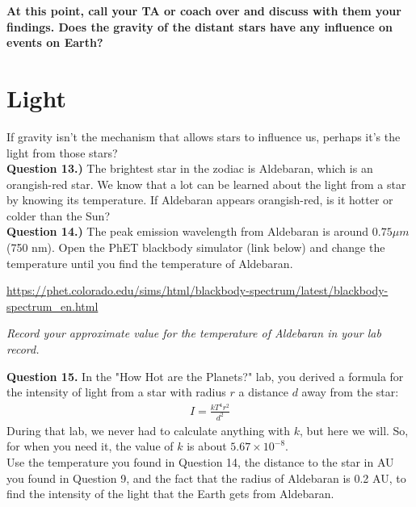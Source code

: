 \documentclass[11pt]{article}
\begin{document}
\bf At this point, call your TA or coach over and discuss with them your findings. Does the gravity of the distant stars have any influence on events on Earth?

\rm 

\newpage

\section{Light}
If gravity isn't the mechanism that allows stars to influence us, perhaps it's the light from those stars?\\

\textbf{Question 13.)} The brightest star in the zodiac is Aldebaran, which is an orangish-red star. We know that a lot can be learned about the light from a star by knowing its temperature. If Aldebaran appears orangish-red, is it hotter or colder than the Sun?\\
%

\textbf{Question 14.)} The peak emission wavelength from Aldebaran is around $0.75\mu m$ (750 nm). Open the PhET blackbody simulator (link below) and change the temperature until you find the temperature of Aldebaran.

\begin{center}\small
	\url{https://phet.colorado.edu/sims/html/blackbody-spectrum/latest/blackbody-spectrum_en.html}
\end{center}
%

\vspace{1em}

{\it Record your approximate value for the temperature of Aldebaran in your lab record.}
\vspace{2em}

\textbf{Question 15.} In the "How Hot are the Planets?" lab, you derived a formula for the intensity of light from a star with radius $r$ a distance $d$ away from the star:
\begin{align*}
I=\frac{k T^4r^2}{d^2}
\end{align*} 
During that lab, we never had to calculate anything with $k$, but here we will. So, for when you need it, the value of $k$ is about $5.67\times 10^{-8}$.\\

Use the temperature you found in Question 14, the distance to the star in AU you found in Question 9, and the fact that the radius of Aldebaran is 0.2 AU, to find the intensity of the light that the Earth gets from Aldebaran.\\
%
\end{document}
